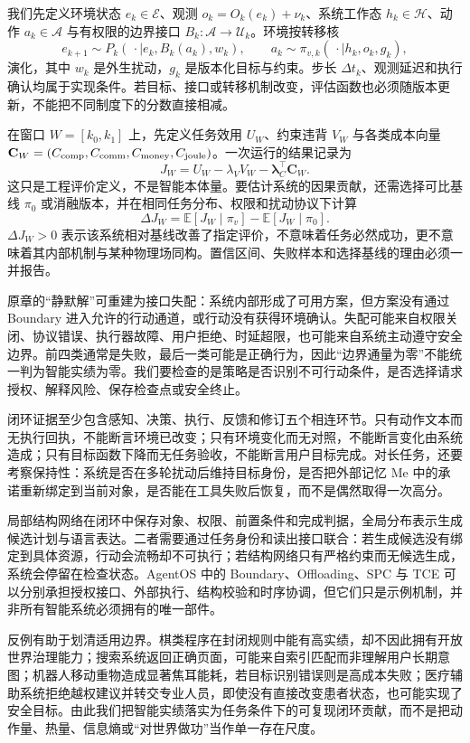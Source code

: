 我们先定义环境状态 $e_k\in\mathcal E$、观测 $o_k=O_k(e_k)+\nu_k$、系统工作态 $h_k\in\mathcal H$、动作 $a_k\in\mathcal A$ 与有权限的边界接口 $B_k:\mathcal A\rightarrow\mathcal U_k$。环境按转移核
\[
e_{k+1}\sim P_k(\,\cdot\mid e_k,B_k(a_k),w_k),
\qquad
a_k\sim\pi_{v,k}(\,\cdot\mid h_k,o_k,g_k),
\]
演化，其中 $w_k$ 是外生扰动，$g_k$ 是版本化目标与约束。步长 $\Delta t_k$、观测延迟和执行确认均属于实现条件。若目标、接口或转移机制改变，评估函数也必须随版本更新，不能把不同制度下的分数直接相减。

在窗口 $W=[k_0,k_1]$ 上，先定义任务效用 $U_W$、约束违背 $V_W$ 与各类成本向量 $\mathbf C_W=(C_{\rm comp},C_{\rm comm},C_{\rm money},C_{\rm joule})$。一次运行的结果记录为
\[
J_W=U_W-\lambda_VV_W-\boldsymbol\lambda_C^\top\mathbf C_W .
\]
这只是工程评价定义，不是智能本体量。要估计系统的因果贡献，还需选择可比基线 $\pi_0$ 或消融版本，并在相同任务分布、权限和扰动协议下计算
\[
\Delta J_W=
\mathbb E[J_W\mid \pi_{v}]
-\mathbb E[J_W\mid \pi_0].
\]
$\Delta J_W>0$ 表示该系统相对基线改善了指定评价，不意味着任务必然成功，更不意味着其内部机制与某种物理场同构。置信区间、失败样本和选择基线的理由必须一并报告。

原章的“静默解”可重建为接口失配：系统内部形成了可用方案，但方案没有通过 Boundary 进入允许的行动通道，或行动没有获得环境确认。失配可能来自权限关闭、协议错误、执行器故障、用户拒绝、时延超限，也可能来自系统主动遵守安全边界。前四类通常是失败，最后一类可能是正确行为，因此“边界通量为零”不能统一判为智能实绩为零。我们要检查的是策略是否识别不可行动条件，是否选择请求授权、解释风险、保存检查点或安全终止。

闭环证据至少包含感知、决策、执行、反馈和修订五个相连环节。只有动作文本而无执行回执，不能断言环境已改变；只有环境变化而无对照，不能断言变化由系统造成；只有目标函数下降而无任务验收，不能断言用户目标完成。对长任务，还要考察保持性：系统是否在多轮扰动后维持目标身份，是否把外部记忆 $\mathrm{Me}$ 中的承诺重新绑定到当前对象，是否能在工具失败后恢复，而不是偶然取得一次高分。

局部结构网络在闭环中保存对象、权限、前置条件和完成判据，全局分布表示生成候选计划与语言表达。二者需要通过任务身份和读出接口联合：若生成候选没有绑定到具体资源，行动会流畅却不可执行；若结构网络只有严格约束而无候选生成，系统会停留在检查状态。AgentOS 中的 Boundary、Offloading、SPC 与 TCE 可以分别承担授权接口、外部执行、结构校验和时序协调，但它们只是示例机制，并非所有智能系统必须拥有的唯一部件。

反例有助于划清适用边界。棋类程序在封闭规则中能有高实绩，却不因此拥有开放世界治理能力；搜索系统返回正确页面，可能来自索引匹配而非理解用户长期意图；机器人移动重物造成显著焦耳能耗，若目标识别错误则是高成本失败；医疗辅助系统拒绝越权建议并转交专业人员，即使没有直接改变患者状态，也可能实现了安全目标。由此我们把智能实绩落实为任务条件下的可复现闭环贡献，而不是把动作量、热量、信息熵或“对世界做功”当作单一存在尺度。

